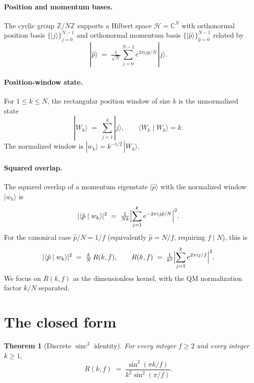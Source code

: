 \documentclass[11pt,reqno]{amsart}
\theoremstyle{plain}
\newtheorem{theorem}{Theorem}[section]
\theoremstyle{definition}
\theoremstyle{remark}
\newcommand{\Z}{\mathbb{Z}}
\newcommand{\C}{\mathbb{C}}
\DeclareMathOperator{\sinc}{sinc}
\begin{document}
\paragraph{Position and momentum bases.}
The cyclic group $\Z/N\Z$ supports a Hilbert space $\mathcal{H} = \C^{N}$ with orthonormal
position basis $\{|j\rangle\}_{j=0}^{N-1}$ and orthonormal momentum basis
$\{|\hat p\rangle\}_{\hat p=0}^{N-1}$ related by
\[
  |\hat p\rangle \;=\; \tfrac{1}{\sqrt{N}}\sum_{j=0}^{N-1} e^{2\pi i j \hat p / N}\,
  |j\rangle.
\]

\paragraph{Position-window state.}
For $1 \le k \le N$, the rectangular position window of size $k$ is the unnormalized
state
\[
  |W_{k}\rangle \;=\; \sum_{j=1}^{k} |j\rangle, \qquad \langle W_{k} \mid W_{k}\rangle = k.
\]
The normalized window is $|w_{k}\rangle = k^{-1/2}\,|W_{k}\rangle$.

\paragraph{Squared overlap.}
The squared overlap of a momentum eigenstate $|\hat p\rangle$ with the normalized window
$|w_{k}\rangle$ is
\[
  |\langle \hat p \mid w_{k}\rangle|^{2}
  \;=\; \tfrac{1}{N k}\Bigl|\sum_{j=1}^{k} e^{-2\pi i j \hat p / N}\Bigr|^{2}.
\]
For the canonical case $\hat p / N = 1/f$ (equivalently $\hat p = N/f$, requiring $f \mid
N$), this is
\begin{equation}\label{eq:overlap-normalized}
  |\langle \hat p \mid w_{k}\rangle|^{2}
  \;=\; \tfrac{k}{N}\, R(k,f), \qquad
  R(k,f) \;=\; \tfrac{1}{k^{2}}\Bigl|\sum_{j=1}^{k} e^{2\pi i j / f}\Bigr|^{2}.
\end{equation}
We focus on $R(k,f)$ as the dimensionless kernel, with the QM normalization factor $k/N$
separated.

\section{The closed form}
\label{sec:closedform}

\begin{theorem}[Discrete $\sinc^{2}$ identity]
\label{thm:closedform}
For every integer $f \ge 2$ and every integer $k \ge 1$,
\[
  R(k,f) \;=\; \frac{\sin^{2}(\pi k/f)}{k^{2}\sin^{2}(\pi/f)}.
\]
\end{theorem}
\end{document}
